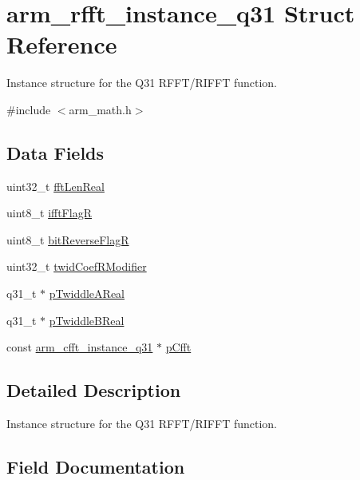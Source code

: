 \hypertarget{structarm__rfft__instance__q31}{}\section{arm\+\_\+rfft\+\_\+instance\+\_\+q31 Struct Reference}
\label{structarm__rfft__instance__q31}


Instance structure for the Q31 R\+F\+F\+T/\+R\+I\+F\+FT function.  




{\ttfamily \#include $<$arm\+\_\+math.\+h$>$}

\subsection*{Data Fields}
\begin{DoxyCompactItemize}
\item 
uint32\+\_\+t \mbox{\hyperlink{structarm__rfft__instance__q31_adf0d4604cf5546075d9d4cf122d6c986}{fft\+Len\+Real}}
\item 
uint8\+\_\+t \mbox{\hyperlink{structarm__rfft__instance__q31_a787d72055c89e4d62b188d6bd646341c}{ifft\+FlagR}}
\item 
uint8\+\_\+t \mbox{\hyperlink{structarm__rfft__instance__q31_ad56ec2425e2422108b8767b43d944591}{bit\+Reverse\+FlagR}}
\item 
uint32\+\_\+t \mbox{\hyperlink{structarm__rfft__instance__q31_a5b06f7f76c018db993fe6acc5708c589}{twid\+Coef\+R\+Modifier}}
\item 
q31\+\_\+t $\ast$ \mbox{\hyperlink{structarm__rfft__instance__q31_a059faa282f9186687d843ead4a7a0d7e}{p\+Twiddle\+A\+Real}}
\item 
q31\+\_\+t $\ast$ \mbox{\hyperlink{structarm__rfft__instance__q31_a611c385424ce77519f599980f96d5846}{p\+Twiddle\+B\+Real}}
\item 
const \mbox{\hyperlink{structarm__cfft__instance__q31}{arm\+\_\+cfft\+\_\+instance\+\_\+q31}} $\ast$ \mbox{\hyperlink{structarm__rfft__instance__q31_aa583d759b8b176ad1696b27eb5821daf}{p\+Cfft}}
\end{DoxyCompactItemize}


\subsection{Detailed Description}
Instance structure for the Q31 R\+F\+F\+T/\+R\+I\+F\+FT function. 

\subsection{Field Documentation}
\mbox{\label{structarm__rfft__instance__q31_ad56ec2425e2422108b8767b43d944591}} 
